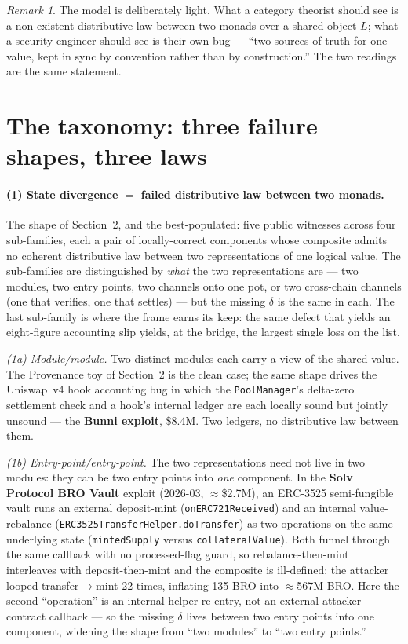 \documentclass[11pt]{amsart}
\theoremstyle{definition}
\theoremstyle{remark}
\newtheorem{remark}{Remark}
\newcommand{\ra}{\rightarrow}
\begin{document}
\begin{remark}
The model is deliberately light. What a category theorist should see is a non-existent
distributive law between two monads over a shared object $L$; what a security engineer should
see is their own bug --- ``two sources of truth for one value, kept in sync by convention rather
than by construction.'' The two readings are the same statement.
\end{remark}

\section{The taxonomy: three failure shapes, three laws}

\paragraph{(1) State divergence $=$ failed distributive law between two monads.}
The shape of Section~2, and the best-populated: five public witnesses across four sub-families,
each a pair of locally-correct components whose composite admits no coherent distributive law
between two representations of one logical value. The sub-families are distinguished by
\emph{what} the two representations are --- two modules, two entry points, two channels onto one
pot, or two cross-chain channels (one that verifies, one that settles) --- but the missing
$\delta$ is the same in each. The last sub-family is where the frame earns its keep: the same
defect that yields an eight-figure accounting slip yields, at the bridge, the largest single loss
on the list.

\emph{(1a) Module/module.} Two distinct modules each carry a view of the shared value. The
Provenance toy of Section~2 is the clean case; the same shape drives the Uniswap~v4 hook
accounting bug in which the \texttt{PoolManager}'s delta-zero settlement check and a hook's
internal ledger are each locally sound but jointly unsound --- the \textbf{Bunni exploit},
\$8.4M. Two ledgers, no distributive law between them.

\emph{(1b) Entry-point/entry-point.} The two representations need not live in two modules: they
can be two entry points into \emph{one} component. In the \textbf{Solv Protocol BRO Vault}
exploit (2026-03, $\approx$\$2.7M), an ERC-3525 semi-fungible vault runs an external deposit-mint
(\texttt{onERC721Received}) and an internal value-rebalance
(\texttt{ERC3525TransferHelper.doTransfer}) as two operations on the same underlying state
(\texttt{mintedSupply} versus \texttt{collateralValue}). Both funnel through the same callback
with no processed-flag guard, so rebalance-then-mint interleaves with deposit-then-mint and the
composite is ill-defined; the attacker looped transfer$\ra$mint 22 times, inflating 135 BRO into
$\approx$567M BRO. Here the second ``operation'' is an internal helper re-entry, not an external
attacker-contract callback --- so the missing $\delta$ lives between two entry points into one
component, widening the shape from ``two modules'' to ``two entry points.''
\end{document}
